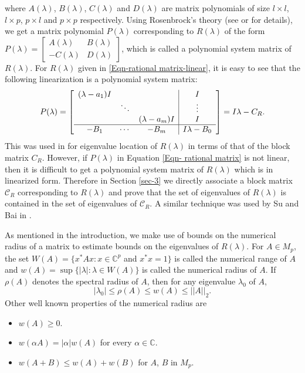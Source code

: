 \documentclass[12pt, reqno]{amsart}
\theoremstyle{definition}
\theoremstyle{remark}
\numberwithin{equation}{section}
\begin{document}
where $A(\lambda)$, $B(\lambda)$, $C(\lambda)$ and $D(\lambda)$ are matrix polynomials 
of size $l \times l$, $l \times p$, $p \times l$ and $p \times p$ respectively. Using 
Rosenbrock's theory (see \cite{Dopico} or \cite{Rosenbrock} for details), we get a matrix polynomial $P(\lambda)$ corresponding 
to $R(\lambda)$ of the form $P(\lambda) = \begin{bmatrix}
A(\lambda) & B(\lambda) \\
-C(\lambda) & D(\lambda)
\end{bmatrix}$, which is called a polynomial system matrix of $R(\lambda)$.  
For $R(\lambda)$ given in \eqref{Eqn-rational matrix-linear}, it is easy to see that 
the following linearization is a polynomial system matrix: 
\begin{equation}
P(\lambda) = \begin{bmatrix}
\begin{array}{c c c|c} \displaystyle
(\lambda- a_1)I & & & I \\
& \ddots & & \vdots \\
&  & (\lambda - a_m)I & I \\
\hline
-B_1 & \cdots & -B_m & I \lambda -B_0
\end{array}
\end{bmatrix}=I\lambda-C_R.
\end{equation}
This was used in \cite{Pallavi} for eigenvalue location of $R(\lambda)$ in terms of that 
of the block matrix $C_R$. However, if $P(\lambda)$ in Equation \eqref{Eqn- rational matrix} is not linear, 
then it is difficult to get a polynomial system matrix of 
$R(\lambda)$ which is in linearized form. Therefore in Section \ref{sec-3} we directly 
associate a block matrix $\mathcal{C}_R$ corresponding to $R(\lambda)$ and prove that 
the set of eigenvalues of $R(\lambda)$ is contained in the set of eigenvalues of 
$\mathcal{C}_R$. A similar technique was used by Su and Bai in \cite{Su-Bai}. 

As mentioned in the introduction, we make use of bounds on the numerical radius of a matrix 
to estimate bounds on the eigenvalues of $R(\lambda)$. For $A \in M_p$, the set 
$W(A) = \{ x^*Ax : x \in \mathbb{C}^p$ and  $x^*x=1\}$ is called the numerical range of 
$A$ and $w(A) = \sup \{ |\lambda| : \lambda \in W(A) \}$ is called the numerical radius 
of $A$. If $\rho(A)$ denotes the spectral radius of $A$, then for any eigenvalue $\lambda_0$ 
of $A$, 
\begin{equation}\label{numerical radius-relationship}
|\lambda_0| \leq \rho(A) \leq w(A) \leq ||A||_2.
\end{equation}
Other well known properties of the numerical radius are  
\begin{itemize}
\item $w(A) \geq 0$.
\item $w(\alpha A) = |\alpha| w(A)$ for every $\alpha \in \mathbb{C}$.
\item $w(A+B) \leq w(A)+w(B)$ for $A$, $B$ in $M_p$. 
\end{itemize}
\end{document}
